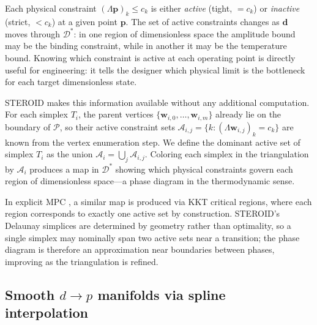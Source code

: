 \documentclass[review,onefignum,onetabnum]{./SIAM_template/siamart171218}
\begin{document}
Each physical constraint $(\Lambda\mathbf{p})_k \leq c_k$ is either
\emph{active} (tight, $= c_k$) or \emph{inactive} (strict, $< c_k$) at a given
point $\mathbf{p}$.  The set of active constraints changes as $\mathbf{d}$ moves
through $\mathcal{D}^*$: in one region of dimensionless space the amplitude bound
may be the binding constraint, while in another it may be the temperature bound.
Knowing which constraint is active at each operating point is directly useful for
engineering: it tells the designer which physical limit is the bottleneck for each
target dimensionless state.

STEROID makes this information available without any additional computation.
For each simplex $T_i$, the parent vertices $\{\mathbf{w}_{i,0}, \ldots,
	\mathbf{w}_{i,m}\}$ already lie on the boundary of $\mathcal{P}$, so their
active constraint sets $\mathcal{A}_{i,j} = \{k : (\Lambda\mathbf{w}_{i,j})_k
	= c_k\}$ are known from the vertex enumeration step.  We define the dominant
active set of simplex $T_i$ as the union $\mathcal{A}_i = \bigcup_j
	\mathcal{A}_{i,j}$.  Coloring each simplex in the triangulation by
$\mathcal{A}_i$ produces a map in $\mathcal{D}^*$ showing which physical
constraints govern each region of dimensionless space---a phase diagram in the
thermodynamic sense.

In explicit MPC \cite{Tondel2003, Fuchs2010}, a similar map is produced via KKT critical
regions, where each region corresponds to exactly one active set by construction.
STEROID's Delaunay simplices are determined by geometry rather than optimality,
so a single simplex may nominally span two active sets near a transition; the
phase diagram is therefore an approximation near boundaries between phases,
improving as the triangulation is refined.

\subsection{Smooth $d \to p$ manifolds via spline interpolation}
\label{sec:splines}
\end{document}
